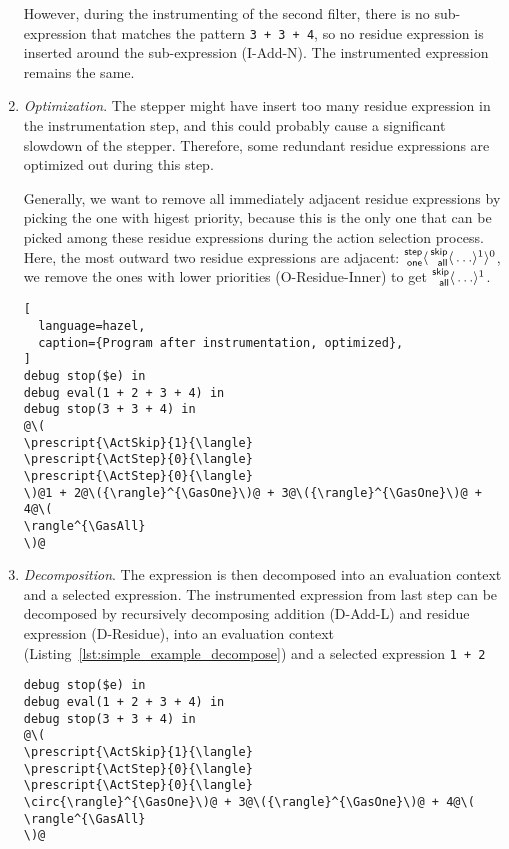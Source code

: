 \begin{enumerate}
  However, during the instrumenting of the second filter, there is no
  sub-expression that matches the pattern
  \lstinline[language=hazel]{3 + 3 + 4}, so no residue expression is
  inserted around the sub-expression (I-Add-N). The instrumented
  expression remains the same.

\item \emph{Optimization}. The stepper might have insert too many
  residue expression in the instrumentation step, and this could
  probably cause a significant slowdown of the stepper. Therefore,
  some redundant residue expressions are optimized out during this
  step.

  Generally, we want to remove all immediately adjacent residue
  expressions by picking the one with higest priority, because this is
  the only one that can be picked among these residue expressions
  during the action selection process. Here, the most outward two
  residue expressions are adjacent:
  \(\Residue{\ActStep}{\GasOne}{0}{\Residue{\ActSkip}{\GasAll}{1}{\ldots}}\),
  we remove the ones with lower priorities (O-Residue-Inner) to get
  \(\Residue{\ActSkip}{\GasAll}{1}{\ldots}\).

\begin{lstlisting}[
  language=hazel,
  caption={Program after instrumentation, optimized},
]
debug stop($e) in
debug eval(1 + 2 + 3 + 4) in
debug stop(3 + 3 + 4) in
@\(
\prescript{\ActSkip}{1}{\langle}
\prescript{\ActStep}{0}{\langle}
\prescript{\ActStep}{0}{\langle}
\)@1 + 2@\({\rangle}^{\GasOne}\)@ + 3@\({\rangle}^{\GasOne}\)@ + 4@\(
\rangle^{\GasAll}
\)@\end{lstlisting}

\item \emph{Decomposition}. \label{num:simple_example_decompose} The
  expression is then decomposed into an evaluation context and a
  selected expression. The instrumented expression from last step can
  be decomposed by recursively decomposing addition (D-Add-L) and
  residue expression (D-Residue), into an evaluation context
  (Listing~\ref{lst:simple_example_decompose}) and a selected
  expression \lstinline{1 + 2}

  \begin{lstlisting}[language=hazel,caption={Decomposed evaluation context},label={lst:simple_example_decompose}]
debug stop($e) in
debug eval(1 + 2 + 3 + 4) in
debug stop(3 + 3 + 4) in
@\(
\prescript{\ActSkip}{1}{\langle}
\prescript{\ActStep}{0}{\langle}
\prescript{\ActStep}{0}{\langle}
\circ{\rangle}^{\GasOne}\)@ + 3@\({\rangle}^{\GasOne}\)@ + 4@\(
\rangle^{\GasAll}
\)@\end{lstlisting}


\end{enumerate}
